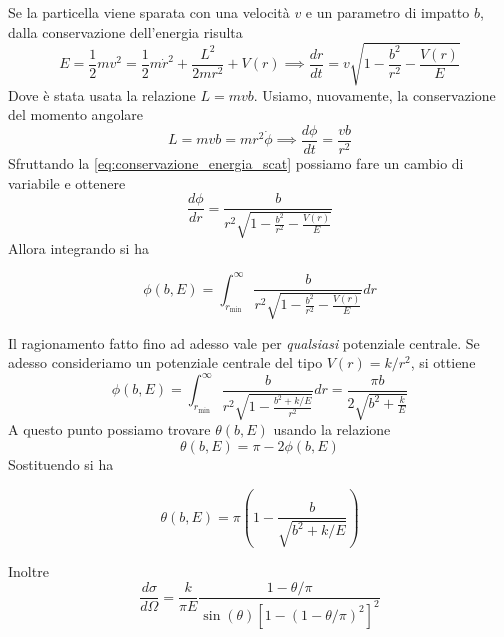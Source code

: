 Se la particella viene sparata con una velocità $v$ e un parametro di impatto $b$, dalla conservazione dell'energia risulta
\begin{equation}
\label{eq:conservazione_energia_scat}
    E = \frac{1}{2} m v^2 = \frac{1}{2} m \dot{r}^2 + \frac{L^2}{2mr^2} + V(r) \implies \frac{dr}{dt} = v \sqrt{1 - \frac{b^2}{r^2} - \frac{V(r)}{E}}
\end{equation}
Dove è stata usata la relazione $L = mvb$. Usiamo, nuovamente, la conservazione del momento angolare
\begin{equation*}
    L = mvb = mr^2 \dot{\phi} \implies \frac{d\phi}{dt} = \frac{vb}{r^2}
\end{equation*}
Sfruttando la \eqref{eq:conservazione_energia_scat} possiamo fare un cambio di variabile e ottenere
\begin{equation}
    \frac{d\phi}{dr} = \frac{b}{r^2 \sqrt{1 - \frac{b^2}{r^2} - \frac{V(r)}{E}}}
\end{equation}
Allora integrando si ha
\begin{tcolorbox}[colback=black!5!white, colframe=black!45!white, boxrule=0.8pt]
\begin{equation}
    \phi(b,E) = \int_{r_{\text{min}}}^\infty \frac{b}{r^2\sqrt{1 - \frac{b^2}{r^2} - \frac{V(r)}{E}}} dr
\end{equation}
\end{tcolorbox}

Il ragionamento fatto fino ad adesso vale per \emph{qualsiasi} potenziale centrale. Se adesso consideriamo un potenziale centrale del tipo $V(r) = k/r^2$, si ottiene 
\begin{equation}
    \phi(b,E) = \int_{r_{\text{min}}}^\infty \frac{b}{r^2\sqrt{1 - \frac{b^2 + k/E}{r^2}}} dr = \frac{\pi b}{2 \sqrt{b^2 + \frac{k}{E}}}
\end{equation}
A questo punto possiamo trovare $\theta(b,E)$ usando la relazione 
\begin{equation}
    \theta(b,E) = \pi - 2 \phi(b,E)
\end{equation}
Sostituendo si ha 
\begin{tcolorbox}[colback=black!5!white, colframe=black!45!white, boxrule=0.8pt]
\begin{equation}
    \theta(b,E) = \pi\left( 1 - \frac{b}{\sqrt{b^2 + k/E}} \right)
\end{equation}
\end{tcolorbox}

Inoltre 
\begin{equation}
    \frac{d\sigma}{d \Omega} = \frac{k}{\pi E} \frac{1 - \theta/\pi}{\sin(\theta)\left[ 1 - \left( 1 - \theta/\pi \right)^2 \right]^2}
\end{equation}

